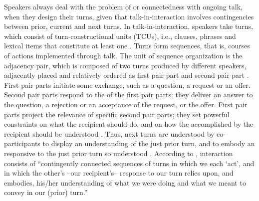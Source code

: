 \documentclass[output=paper]{LSP/langsci}
\begin{document}
Speakers always deal with the problem of  or connectedness with ongoing talk, when they design their turns, given that talk-in-interaction involves contingencies between prior, current and next turns. In talk-in-interaction, speakers take turns, which consist of turn-constructional units (TCUs), i.e., clauses, phrases and lexical items that constitute at least one  \citep[][3--4]{schegloff07}. Turns form sequences, that is, courses of actions implemented through talk. The unit of sequence organization is the adjacency pair, which is composed of two turns produced by different speakers, adjacently placed and relatively ordered as first pair part and second pair part \citep[][13]{schegloff07}. First pair parts initiate some exchange, such as a question, a request or an offer. Second pair parts respond to the  of the first pair parts: they deliver an answer to the question, a rejection or an acceptance of the request, or the offer. First pair parts project the relevance of specific second pair parts; they set powerful constraints on what the recipient should do, and on how the  accomplished by the recipient should be understood \citep[][21]{schegloff07}. Thus, next turns are understood by co-participants to display an understanding of the just prior turn, and to embody an  responsive to the just prior turn so understood \citep[][15]{schegloff07}. According to \citet[][131]{drew12}, interaction consists of ``contingently connected sequences of turns in which we each `act', and in which the other’s –our recipient’s– response to our turn relies upon, and embodies, his/her understanding of what we were doing and what we meant to convey in our (prior) turn.'' 
\end{document}
